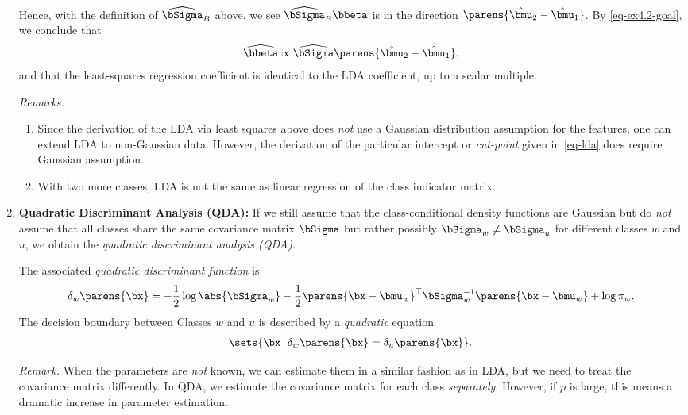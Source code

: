 \documentclass[12pt]{article}
\begin{document}
\begin{enumerate}[label=\textbf{\arabic*.}]
	Hence, with the definition of $\widehat{\bSigma}_B$ above, we see $\widehat{\bSigma}_B \bbeta$ is in the direction $\parens{\hat{\bmu}_2 - \hat{\bmu}_1}$. By \eqref{eq-ex4.2-goal}, we conclude that 
	\begin{align*}
		\widehat{\bbeta} \propto \widehat{\bSigma} \parens{\hat{\bmu}_2 - \hat{\bmu}_1}, 
	\end{align*}
	and that the least-squares regression coefficient is identical to the LDA coefficient, up to a scalar multiple. 
	
	\textit{Remarks.}
	\begin{enumerate}
		\item Since the derivation of the LDA via least squares above does \emph{not} use a Gaussian distribution assumption for the features, one can extend LDA to non-Gaussian data. However, the derivation of the particular intercept or \textit{cut-point} given in \eqref{eq-lda} does require Gaussian assumption. 
		\item With two more classes, LDA is not the same as linear regression of the class indicator matrix. 
	\end{enumerate}
	
	\item \textbf{Quadratic Discriminant Analysis (QDA):} If we still assume that the class-conditional density functions are Gaussian but do \textit{not} assume that all classes share the same covariance matrix $\bSigma$ but rather possibly $\bSigma_w \ne \bSigma_u$ for different classes $w$ and $u$, we obtain the \emph{quadratic discriminant analysis (QDA)}. 
	
	The associated \textit{quadratic discriminant function} is 
	\begin{equation}
		\delta_w \parens{\bx} = -\frac{1}{2} \log \abs{\bSigma_w} - \frac{1}{2} \parens{\bx -\bmu_w}^\top \bSigma_w^{-1} \parens{\bx - \bmu_w} + \log \pi_w. 
	\end{equation}
	The decision boundary between Classes $w$ and $u$ is described by a \emph{quadratic} equation 
	\begin{align*}
		\sets{\bx \,\vert\, \delta_w \parens{\bx} = \delta_{u} \parens{\bx}}. 
	\end{align*}
	
	\textit{Remark.} When the parameters are \emph{not} known, we can estimate them in a similar fashion as in LDA, but we need to treat the covariance matrix differently. In QDA, we estimate the covariance matrix for each class \emph{separately}. However, if $p$ is large, this means a dramatic increase in parameter estimation. 
	

\end{enumerate}
\end{document}
